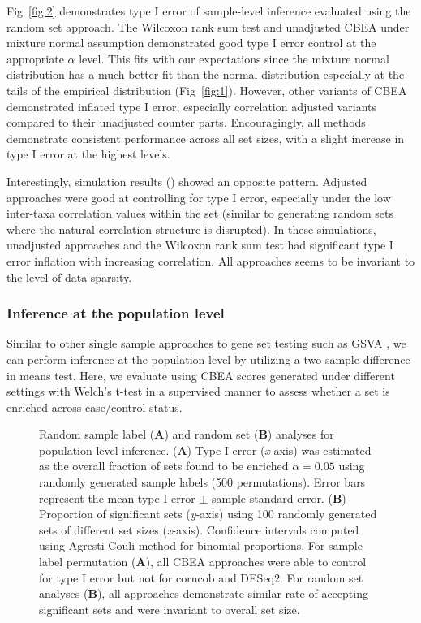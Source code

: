 Fig~\ref{fig:2} demonstrates type I error of sample-level inference evaluated using the random set approach. The Wilcoxon rank sum test and unadjusted CBEA under mixture normal assumption demonstrated good type I error control at the appropriate $\alpha$ level. This fits with our expectations since the mixture normal distribution has a much better fit than the normal distribution especially at the tails of the empirical distribution (Fig~\ref{fig:1}). However, other variants of CBEA demonstrated inflated type I error, especially correlation adjusted variants compared to their unadjusted counter parts. Encouragingly, all methods demonstrate consistent performance across all set sizes, with a slight increase in type I error at the highest levels.   

Interestingly, simulation results () showed an opposite pattern. Adjusted approaches were good at controlling for type I error, especially under the low inter-taxa correlation values within the set (similar to generating random sets where the natural correlation structure is disrupted). In these simulations, unadjusted approaches and the Wilcoxon rank sum test had significant type I error inflation with increasing correlation. All approaches seems to be invariant to the level of data sparsity.  

\subsubsection{Inference at the population level}

Similar to other single sample approaches to gene set testing such as GSVA \cite{hanzelmann2013}, we can perform inference at the population level by utilizing a two-sample difference in means test. Here, we evaluate using CBEA scores generated under different settings with Welch's t-test in a supervised manner to assess whether a set is enriched across case/control status. 

\begin{figure}[!h]
    \centering
    \caption[Random sample label (\textbf{A}) and random set (\textbf{B}) analyses for population level inference]{Random sample label (\textbf{A}) and random set (\textbf{B}) analyses for population level inference. (\textbf{A}) Type I error (\emph{x}-axis) was estimated as the overall fraction of sets found to be enriched $\alpha = 0.05$ using randomly generated sample labels (500 permutations).  Error bars represent the mean type I error $\pm$ sample standard error. (\textbf{B}) Proportion of significant sets (\emph{y}-axis) using 100 randomly generated sets of different set sizes (\emph{x}-axis). Confidence intervals computed using Agresti-Couli method for binomial proportions. For sample label permutation (\textbf{A}), all CBEA approaches were able to control for type I error but not for corncob and DESeq2. For random set analyses (\textbf{B}), all approaches demonstrate similar rate of accepting significant sets and were invariant to overall set size.}  
    \label{fig:3}
\end{figure}


